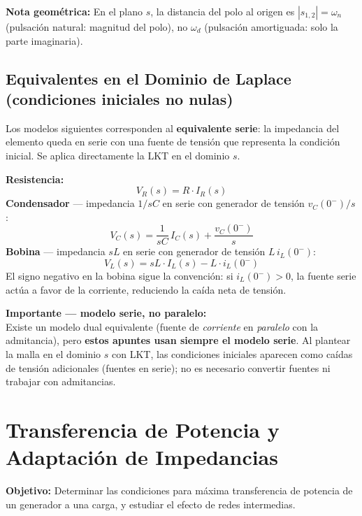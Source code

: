 \documentclass[12pt,a4paper]{article}
\begin{document}
\vspace{4pt}
\textbf{Nota geométrica:} En el plano $s$, la distancia del polo al origen es
$|s_{1,2}| = \omega_n$ (pulsación natural: magnitud del polo), no $\omega_d$ (pulsación amortiguada: solo la parte imaginaria).
\clearpage %
\subsection{Equivalentes en el Dominio de Laplace (condiciones iniciales no nulas)}

Los modelos siguientes corresponden al \textbf{equivalente serie}: la impedancia del
elemento queda en serie con una fuente de tensión que representa la condición inicial.
Se aplica directamente la LKT en el dominio $s$.

\begin{formulabox}
\textbf{Resistencia:}
\[
  V_R(s) = R\cdot I_R(s)
\]
\textbf{Condensador} — impedancia $1/sC$ en serie con generador de tensión $v_C(0^-)/s$:
\[
  V_C(s) = \frac{1}{sC}\,I_C(s) + \frac{v_C(0^-)}{s}
\]
\textbf{Bobina} — impedancia $sL$ en serie con generador de tensión $L\,i_L(0^-)$:
\[
  V_L(s) = sL\cdot I_L(s) - L\cdot i_L(0^-)
\]
El signo negativo en la bobina sigue la convención: si $i_L(0^-)>0$, la fuente
serie actúa a favor de la corriente, reduciendo la caída neta de tensión.
\end{formulabox}

\begin{warnbox}
\textbf{\color{warnorangeline}Importante — modelo serie, no paralelo:}\\[4pt]
Existe un modelo dual equivalente (fuente de \emph{corriente} en \emph{paralelo} con
la admitancia), pero \textbf{estos apuntes usan siempre el modelo serie}. Al plantear
la malla en el dominio $s$ con LKT, las condiciones iniciales aparecen como caídas
de tensión adicionales (fuentes en serie); no es necesario convertir fuentes ni
trabajar con admitancias.
\end{warnbox}
\clearpage %
\section{Transferencia de Potencia y Adaptación de Impedancias}

\textbf{Objetivo:} Determinar las condiciones para máxima transferencia de potencia
de un generador a una carga, y estudiar el efecto de redes intermedias.
\end{document}
